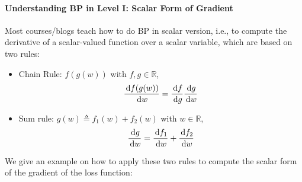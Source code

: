 \paragraph{Understanding BP in Level I: Scalar Form of Gradient}
Most courses/blogs teach how to do BP in scalar version, i.e., to compute the derivative of a scalar-valued function over a scalar variable, which are based on two rules:
\begin{itemize}
\item
Chain Rule: $f(g(w))$ with $f,g\in\mathbb{R}$,
\[
\frac{\,\mathrm{d} f(g(w))}{\,\mathrm{d} w} = \frac{\,\mathrm{d} f}{\,\mathrm{d} g}\frac{\,\mathrm{d} g}{\,\mathrm{d} w}
\]
\item
Sum rule: $g(w)\triangleq f_1(w)+f_2(w)$ with $w\in\mathbb{R}$,
\[
\frac{\,\mathrm{d} g}{\,\mathrm{d} w} = \frac{\,\mathrm{d} f_1}{\,\mathrm{d} w} + \frac{\,\mathrm{d} f_2}{\,\mathrm{d} w}
\]
\end{itemize}
We give an example on how to apply these two rules to compute the scalar form of the gradient of the loss function: 
